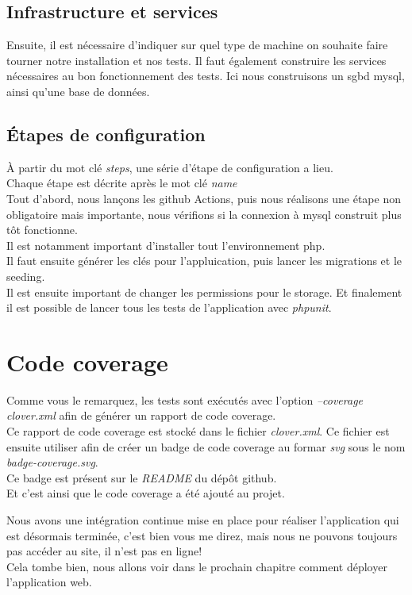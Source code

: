 \documentclass[
    iai, %
    il, %
]{heig-tb}
\begin{document}
\subsection{Infrastructure et services}
Ensuite, il est nécessaire d'indiquer sur quel type de machine on souhaite faire tourner notre
installation et nos tests. Il faut également construire les services nécessaires au bon
fonctionnement des tests. Ici nous construisons un \Gls{sgbd} \Gls{mysql}, ainsi qu'une base de données.

\subsection{Étapes de configuration}

À partir du mot clé \emph{steps}, une série d'étape de configuration a lieu. \\
Chaque étape est décrite après le mot clé \emph{name}\\
Tout d'abord, nous lançons les \Gls{github} Actions, puis nous réalisons une étape non obligatoire mais
importante, nous vérifions si la connexion à \Gls{mysql} construit plus tôt fonctionne.\\
Il est notamment important d'installer tout l'environnement \Gls{php}.\\
Il faut ensuite générer les clés pour l'appluication, puis lancer les migrations et le
seeding.\\
Il est ensuite important de changer les permissions pour le storage. Et finalement il est possible
de lancer tous les tests de l'application avec \emph{phpunit}. \\

\section{Code coverage}
Comme vous le remarquez, les tests sont exécutés avec l'option \emph{--coverage clover.xml} afin de générer un rapport de code coverage. \\
Ce rapport de code coverage est stocké dans le fichier \emph{clover.xml}. Ce fichier est ensuite utiliser afin de créer un badge de code coverage au formar \emph{svg} sous le nom \emph{badge-coverage.svg}. \\
Ce badge est présent sur le \emph{README} du dépôt \Gls{github}. \\
Et c'est ainsi que le code coverage a été ajouté au projet.

Nous avons une intégration continue mise en place pour réaliser l'application qui est désormais terminée, c'est bien vous me direz, mais nous ne pouvons toujours pas accéder au site, il n'est pas en ligne! \\
Cela tombe bien, nous allons voir dans le prochain chapitre comment déployer l'application web.
\end{document}
